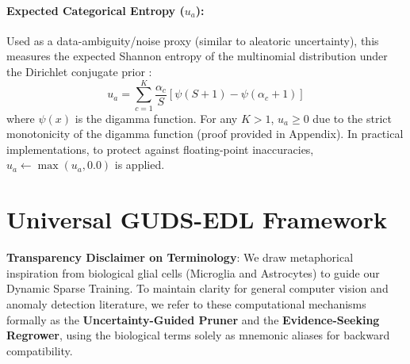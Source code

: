 \documentclass[letterpaper]{article} %
\begin{document}
\paragraph{Expected Categorical Entropy ($u_a$):} Used as a data-ambiguity/noise proxy (similar to aleatoric uncertainty), this measures the expected Shannon entropy of the multinomial distribution under the Dirichlet conjugate prior \cite{malinin2018predictive}:
\begin{equation}\label{eq:u_a}
    u_a = \sum_{c=1}^K \frac{\alpha_c}{S} \left[\psi(S + 1) - \psi(\alpha_c + 1)\right]
\end{equation}
where $\psi(x)$ is the digamma function. For any $K > 1$, $u_a \ge 0$ due to the strict monotonicity of the digamma function (proof provided in Appendix). In practical implementations, to protect against floating-point inaccuracies, $u_a \leftarrow \max(u_a, 0.0)$ is applied.


\section{Universal GUDS-EDL Framework}\label{sec:methodology}

\textbf{Transparency Disclaimer on Terminology}: We draw metaphorical inspiration from biological glial cells (Microglia and Astrocytes) to guide our Dynamic Sparse Training. To maintain clarity for general computer vision and anomaly detection literature, we refer to these computational mechanisms formally as the \textbf{Uncertainty-Guided Pruner} and the \textbf{Evidence-Seeking Regrower}, using the biological terms solely as mnemonic aliases for backward compatibility.
\end{document}
